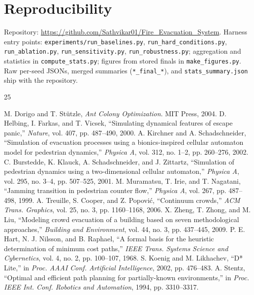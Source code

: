 \documentclass[conference]{IEEEtran}
\begin{document}
\section*{Reproducibility}
Repository: \url{https://github.com/Sathvikar01/Fire_Evacuation_System}. Harness entry points: \texttt{experiments/run\_baselines.py}, \texttt{run\_hard\_conditions.py}, \texttt{run\_ablation.py}, \texttt{run\_sensitivity.py}, \texttt{run\_robustness.py}; aggregation and statistics in \texttt{compute\_stats.py}; figures from stored finals in \texttt{make\_figures.py}. Raw per-seed JSONs, merged summaries (\texttt{*\_final\_*}), and \texttt{stats\_summary.json} ship with the repository.

\begin{thebibliography}{25}

 M. Dorigo and T. St\"utzle, \emph{Ant Colony Optimization}. MIT Press, 2004.
 D. Helbing, I. Farkas, and T. Vicsek, ``Simulating dynamical features of escape panic,'' \emph{Nature}, vol. 407, pp. 487--490, 2000.
 A. Kirchner and A. Schadschneider, ``Simulation of evacuation processes using a bionics-inspired cellular automaton model for pedestrian dynamics,'' \emph{Physica A}, vol. 312, no. 1--2, pp. 260--276, 2002.
 C. Burstedde, K. Klauck, A. Schadschneider, and J. Zittartz, ``Simulation of pedestrian dynamics using a two-dimensional cellular automaton,'' \emph{Physica A}, vol. 295, no. 3--4, pp. 507--525, 2001.
 M. Muramatsu, T. Irie, and T. Nagatani, ``Jamming transition in pedestrian counter flow,'' \emph{Physica A}, vol. 267, pp. 487--498, 1999.
 A. Treuille, S. Cooper, and Z. Popovi\'c, ``Continuum crowds,'' \emph{ACM Trans. Graphics}, vol. 25, no. 3, pp. 1160--1168, 2006.
 X. Zheng, T. Zhong, and M. Liu, ``Modeling crowd evacuation of a building based on seven methodological approaches,'' \emph{Building and Environment}, vol. 44, no. 3, pp. 437--445, 2009.
 P. E. Hart, N. J. Nilsson, and B. Raphael, ``A formal basis for the heuristic determination of minimum cost paths,'' \emph{IEEE Trans. Systems Science and Cybernetics}, vol. 4, no. 2, pp. 100--107, 1968.
 S. Koenig and M. Likhachev, ``D* Lite,'' in \emph{Proc. AAAI Conf. Artificial Intelligence}, 2002, pp. 476--483.
 A. Stentz, ``Optimal and efficient path planning for partially-known environments,'' in \emph{Proc. IEEE Int. Conf. Robotics and Automation}, 1994, pp. 3310--3317.

\end{thebibliography}
\end{document}
